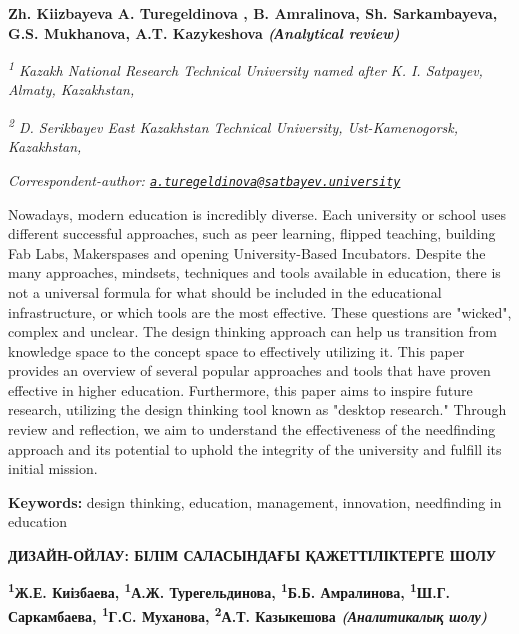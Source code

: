 
\begin{articleheader}

{\bfseries Zh. Kiizbayeva\authorid
A. Turegeldinova\textsuperscript{\envelope } \authorid,
B. Amralinova\authorid,
Sh. Sarkambayeva\authorid,
G.S. Mukhanova\authorid,
A.T. Kazykeshova\authorid
\emph{(Аnalytical review)}}
\end{articleheader}

\begin{affiliation}
\emph{\textsuperscript{1} Kazakh National Research Technical University named after K. I. Satpayev, Almaty, Kazakhstan,}

\emph{\textsuperscript{2} D. Serikbayev East Kazakhstan Technical University, Ust-Kamenogorsk, Kazakhstan,}

\raggedright \textsuperscript{\envelope }{\em Correspondent-author: \href{mailto:a.turegeldinova@satbayev.university}{\nolinkurl{a.turegeldinova@satbayev.university}}}
\end{affiliation}

Nowadays, modern education is incredibly diverse. Each university or
school uses different successful approaches, such as peer learning,
flipped teaching, building Fab Labs, Makerspases and opening
University-Based Incubators. Despite the many approaches, mindsets,
techniques and tools available in education, there is not a universal
formula for what should be included in the educational infrastructure,
or which tools are the most effective. These questions are "wicked",
complex and unclear. The design thinking approach can help us transition
from knowledge space to the concept space to effectively utilizing it.
This paper provides an overview of several popular approaches and tools
that have proven effective in higher education. Furthermore, this paper
aims to inspire future research, utilizing the design thinking tool
known as "desktop research." Through review and reflection, we aim to
understand the effectiveness of the needfinding approach and its
potential to uphold the integrity of the university and fulfill its
initial mission.

{\bfseries Keywords:} design thinking, education, management, innovation,
needfinding in education

\begin{articleheader}
{\bfseries ДИЗАЙН-ОЙЛАУ: БІЛІМ САЛАСЫНДАҒЫ ҚАЖЕТТІЛІКТЕРГЕ ШОЛУ}

{\bfseries  
\textsuperscript{1}Ж.Е. Киізбаева,  
\textsuperscript{1}А.Ж. Турегельдинова\textsuperscript{\envelope },  
\textsuperscript{1}Б.Б. Амралинова,  
\textsuperscript{1}Ш.Г. Саркамбаева,  
\textsuperscript{1}Г.С. Муханова,  
\textsuperscript{2}А.Т. Казыкешова  
\emph{(Аналитикалық шолу)}}
\end{articleheader}

